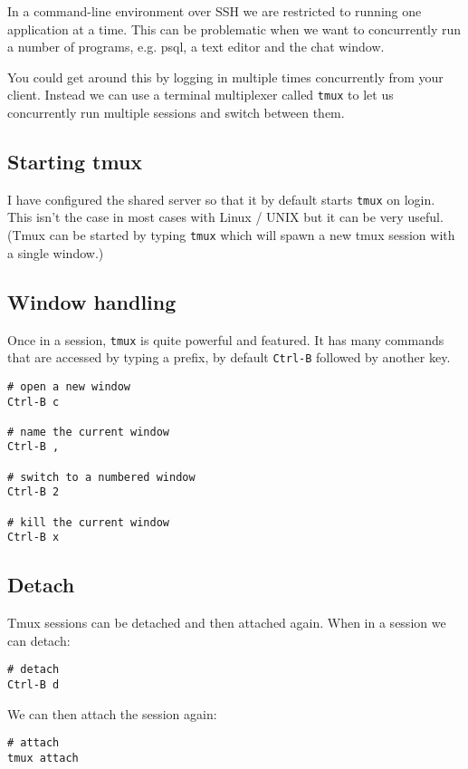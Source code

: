 In a command-line environment over SSH we are restricted to running one application at a time.
This can be problematic when we want to concurrently run a number of programs, e.g. psql, a text editor and the chat window. 

You could get around this by logging in multiple times concurrently from your client.
Instead we can use a terminal multiplexer called \texttt{tmux} to let us concurrently run multiple sessions and switch between them.

\subsection{Starting tmux}

I have configured the shared server so that it by default starts \texttt{tmux} on login.
This isn't the case in most cases with Linux / UNIX but it can be very useful.
(Tmux can be started by typing \texttt{tmux} which will spawn a new tmux session with a single window.)

\subsection{Window handling}

Once in a session, \texttt{tmux} is quite powerful and featured.
It has many commands that are accessed by typing a prefix, by default \texttt{Ctrl-B} followed by another key.

\begin{verbatim}
# open a new window
Ctrl-B c

# name the current window
Ctrl-B , 

# switch to a numbered window 
Ctrl-B 2

# kill the current window
Ctrl-B x 
\end{verbatim}

\subsection{Detach}

Tmux sessions can be detached and then attached again.
When in a session we can detach:
\begin{verbatim}
# detach 
Ctrl-B d 
\end{verbatim}

We can then attach the session again:
\begin{verbatim}
# attach
tmux attach
\end{verbatim}

